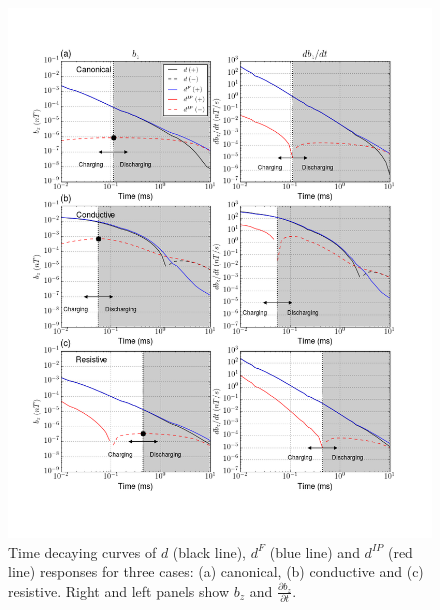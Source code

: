 \documentclass[a4paper, 11pt]{article}
\newcommand{\dip}{d^{IP}}
\begin{document}
\begin{figure}[htb]
\includegraphics[width=1.0\textwidth]{figures/threecasesresp/EMIP_threecases.png}
  \centering
  \caption{Time decaying curves of $d$ (black line), $d^F$ (blue line) and $\dip$ (red line) responses for three cases: (a) canonical, (b) conductive and (c) resistive. Right and left panels show $b_z$ and $\frac{\partial b_z}{\partial t}$. }
  \label{F:IPrespCurves}
\end{figure}
\end{document}
